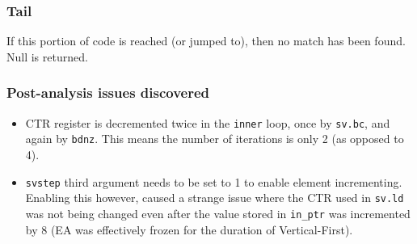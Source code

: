 \subsubsection{Tail}

If this portion of code is reached (or jumped to), then no
match has been found. Null is returned.

\subsubsection{Post-analysis issues discovered}

\begin{itemize}
  \item \acrshort{CTR} register is decremented twice in the \texttt{inner} loop, once by
  \texttt{sv.bc}, and again by \texttt{bdnz}.
  This means the number of iterations is only 2 (as opposed to 4).
  \item \texttt{svstep} third argument needs to be set to 1 to enable
  element incrementing. Enabling this however, caused a strange issue where the
  \acrfull{CTR} used in \texttt{sv.ld} was not being changed even
  after the value stored in \texttt{in\_ptr} was incremented by 8
  (\acrshort{EA} was effectively frozen for the duration of Vertical-First).
\end{itemize}
